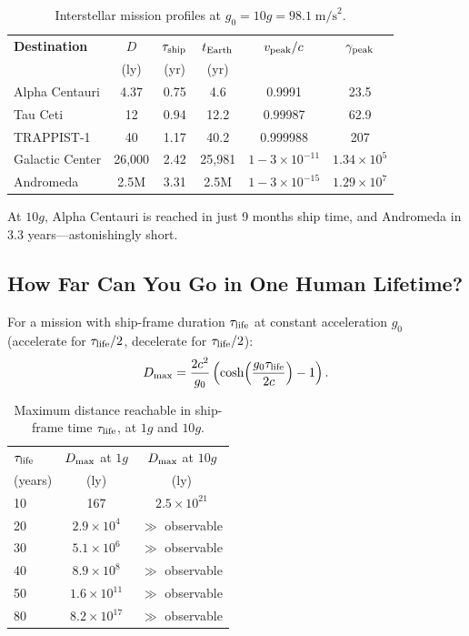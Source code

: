\documentclass[aps,prd,twocolumn,superscriptaddress,nofootinbib]{revtex4-2}
\newcommand{\ee}[1]{\times 10^{#1}}
\begin{document}
\begin{table}[H]
\centering
\caption{Interstellar mission profiles at $g_0 = 10g =
98.1\;\text{m/s}^2$.}
\label{tab:10g-missions}
\begin{tabular}{lccccc}
\toprule
\textbf{Destination} & $D$ & $\tau_{\rm ship}$ &
$t_{\rm Earth}$ & $v_{\rm peak}/c$ & $\gamma_{\rm peak}$ \\
 & (ly) & (yr) & (yr) & & \\
\midrule
Alpha Centauri    & 4.37   & 0.75   & 4.6    & 0.9991 & 23.5 \\
Tau Ceti          & 12     & 0.94   & 12.2   & 0.99987 & 62.9 \\
TRAPPIST-1        & 40     & 1.17   & 40.2   & 0.999988 & 207 \\
Galactic Center   & 26,000 & 2.42   & 25,981 & $1 - 3\ee{-11}$ & $1.34\ee{5}$ \\
Andromeda         & 2.5M   & 3.31   & 2.5M   & $1 - 3\ee{-15}$ & $1.29\ee{7}$ \\
\bottomrule
\end{tabular}
\end{table}

At $10g$, Alpha Centauri is reached in just 9 months ship time, and
Andromeda in 3.3 years---astonishingly short.

\subsection{How Far Can You Go in One Human Lifetime?}

For a mission with ship-frame duration $\tau_{\rm life}$ at constant
acceleration $g_0$ (accelerate for $\tau_{\rm life}/2$, decelerate
for $\tau_{\rm life}/2$):
\begin{equation}\label{eq:max-distance}
D_{\rm max} = \frac{2c^2}{g_0}\left(\cosh\!\left(
\frac{g_0\tau_{\rm life}}{2c}\right) - 1\right).
\end{equation}

\begin{table}[H]
\centering
\caption{Maximum distance reachable in ship-frame time
$\tau_{\rm life}$, at $1g$ and $10g$.}
\label{tab:max-distance}
\begin{tabular}{lcc}
\toprule
$\tau_{\rm life}$ & $D_{\rm max}$ at $1g$ &
$D_{\rm max}$ at $10g$ \\
(years) & (ly) & (ly) \\
\midrule
10  & 167    & $2.5\ee{21}$ \\
20  & $2.9\ee{4}$ & $\gg$ observable \\
30  & $5.1\ee{6}$ & $\gg$ observable \\
40  & $8.9\ee{8}$ & $\gg$ observable \\
50  & $1.6\ee{11}$ & $\gg$ observable \\
80  & $8.2\ee{17}$ & $\gg$ observable \\
\bottomrule
\end{tabular}
\end{table}
\end{document}
